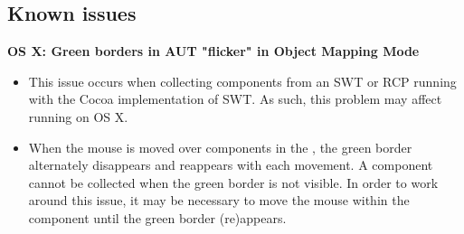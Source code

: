 \subsection{Known issues}

\textbf{OS X: Green borders in AUT "flicker" in Object Mapping Mode}
\begin{itemize}
\item This issue occurs when collecting components from an SWT or RCP \gdaut{} running with the Cocoa implementation of SWT. As such, this problem may affect \gdauts{} running on OS X.
\item When the mouse is moved over components in the \gdaut{}, the green border alternately disappears and reappears with each movement. A component cannot be collected when the green border is not visible. In order to work around this issue, it may be necessary to move the mouse within the component until the green border (re)appears.
\end{itemize}
